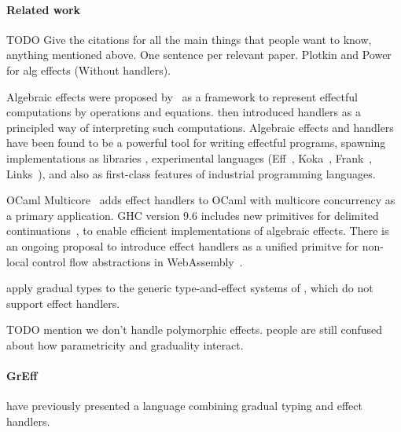 \paragraph{Related work}

TODO Give the citations for all the main things that people want to know, anything mentioned above.
One sentence per relevant paper. Plotkin and Power for alg effects (Without handlers).

Algebraic effects were proposed by~\citet{plotkin-power-2001} as a framework
to represent effectful computations by operations and equations.
\citet{plotkin-pretnar-2009} then introduced handlers as a principled way
of interpreting such computations. Algebraic effects and handlers have been found
to be a powerful tool for writing effectful programs, spawning implementations
as libraries \citep{kammar2013handlers},
experimental languages (Eff~\citep{bauer-pretnar-2014}, Koka~\citep{leijen04}, Frank~\citep{dobedo}, Links~\citep{hillerstrom2016}),
and also as first-class features of industrial programming languages.


OCaml Multicore~\citep{dolan-2015} adds effect handlers to OCaml with
multicore concurrency as a primary application.
GHC version 9.6 includes new primitives for delimited continuations~\citep{ghc-delcont},
to enable efficient implementations of algebraic effects.
There is an ongoing proposal to introduce effect handlers as a unified primitve
for non-local control flow abstractions in WebAssembly~\citep{wasmfx}.

\citet{schwerter-2016} apply gradual types to the generic type-and-effect systems of \citet{marino-2009},
which do not support effect handlers.

TODO mention we don't handle polymorphic effects.
people are still confused about how parametricity and graduality interact.

\paragraph{GrEff}
\citet{greff-2023} have previously presented a language combining gradual typing and effect handlers.

